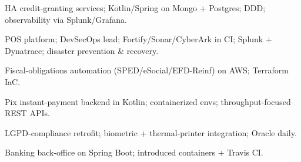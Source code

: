 \documentclass[9pt,a4paper,ragged2e]{altacv}
\begin{document}

\begin{fullwidth}\makecvheader\end{fullwidth}


HA credit-granting services; Kotlin/Spring on Mongo + Postgres; DDD; observability via Splunk/Grafana.

\divider

POS platform; DevSecOps lead; Fortify/Sonar/CyberArk in CI; Splunk + Dynatrace; disaster prevention \& recovery.

\divider

Fiscal-obligations automation (SPED/eSocial/EFD-Reinf) on AWS; Terraform IaC.

\divider

Pix instant-payment backend in Kotlin; containerized envs; throughput-focused REST APIs.

\divider

LGPD-compliance retrofit; biometric + thermal-printer integration; Oracle daily.

\divider

Banking back-office on Spring Boot; introduced containers + Travis CI.

\clearpage
\end{document}
